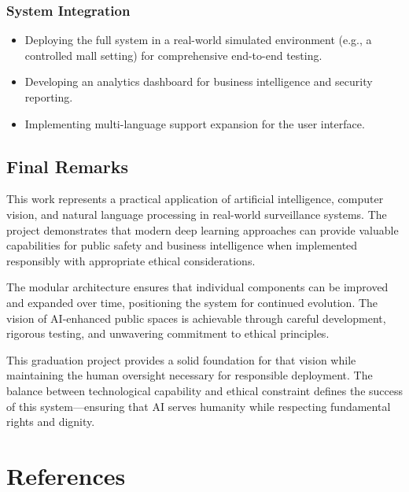 \documentclass[12pt]{report}
\begin{document}
\subsection{System Integration}
\begin{itemize}
    \item Deploying the full system in a real-world simulated environment (e.g., a controlled mall setting) for comprehensive end-to-end testing.
    \item Developing an analytics dashboard for business intelligence and security reporting.
    \item Implementing multi-language support expansion for the user interface.
\end{itemize}

\section{Final Remarks}
This work represents a practical application of artificial intelligence, computer vision, and natural language processing in real-world surveillance systems. The project demonstrates that modern deep learning approaches can provide valuable capabilities for public safety and business intelligence when implemented responsibly with appropriate ethical considerations.

The modular architecture ensures that individual components can be improved and expanded over time, positioning the system for continued evolution. The vision of AI-enhanced public spaces is achievable through careful development, rigorous testing, and unwavering commitment to ethical principles.

This graduation project provides a solid foundation for that vision while maintaining the human oversight necessary for responsible deployment. The balance between technological capability and ethical constraint defines the success of this system---ensuring that AI serves humanity while respecting fundamental rights and dignity.

\newpage

\chapter*{References}
\end{document}
